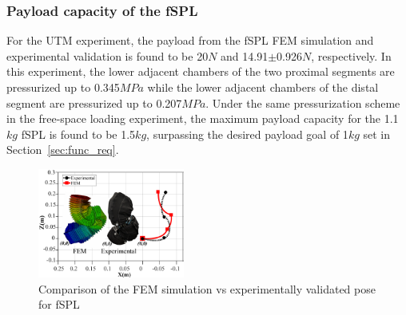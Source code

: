 \documentclass[letterpaper, 10 pt, conference]{ieeeconf}  %
\begin{document}
 
% 

\subsubsection{Payload capacity of the fSPL}

For the UTM experiment, the payload from the fSPL FEM simulation and experimental validation is found to be 20$N$ and 14.91$\pm$0.926$N$, respectively. In this experiment, the lower adjacent chambers of the two proximal segments are pressurized up to 0.345$MPa$ while the lower adjacent chambers of the distal segment are pressurized up to 0.207$MPa$. Under the same pressurization scheme in the free-space loading experiment, the maximum payload capacity for the 1.1$kg$ fSPL is found to be 1.5$kg$, surpassing the desired payload goal of 1$kg$ set in Section~\ref{sec:func_req}.
% 
% 





\begin{figure}[t!]
\centering
\includegraphics[width=0.43\textwidth]{Figures/snakepose_v4}
\setlength{\belowcaptionskip}{-18pt}
\caption{Comparison of the FEM simulation vs experimentally validated pose for fSPL }
\label{fig:pose}
\end{figure}
\end{document}
